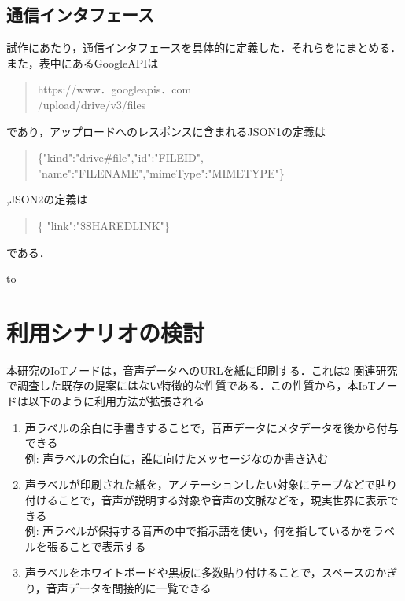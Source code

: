 \documentclass[submit,techrep,noauthor]{ipsj}
\begin{document}
\subsection{通信インタフェース}
試作にあたり，通信インタフェースを具体的に定義した．それらをにまとめる．また，表中にあるGoogleAPIは
\begin{quote}
    https://www．googleapis．com\\/upload/drive/v3/files
\end{quote}であり，アップロードへのレスポンスに含まれるJSON1の定義は\begin{quote}
    \{"kind":"drive\#file","id":"FILEID", "name":"FILENAME","mimeType":"MIMETYPE"\}
\end{quote},JSON2の定義は\begin{quote}
    \{ "link":"\$SHAREDLINK"\}
\end{quote}である．

\begin{table}[tb] 
\caption{試作物の通信インタフェース} 
\label{tab:proto-communication}
\hbox to
\end{table}

\section{利用シナリオの検討}
本研究のIoTノードは，音声データへのURLを紙に印刷する．これは2 関連研究で調査した既存の提案にはない特徴的な性質である．この性質から，本IoTノードは以下のように利用方法が拡張される
\begin{enumerate}
    \item 声ラベルの余白に手書きすることで，音声データにメタデータを後から付与できる\\例: 声ラベルの余白に，誰に向けたメッセージなのか書き込む
    \item 声ラベルが印刷された紙を，アノテーションしたい対象にテープなどで貼り付けることで，音声が説明する対象や音声の文脈などを，現実世界に表示できる \\例: 声ラベルが保持する音声の中で指示語を使い，何を指しているかをラベルを張ることで表示する
    \item 声ラベルをホワイトボードや黒板に多数貼り付けることで，スペースのかぎり，音声データを間接的に一覧できる
\end{enumerate}
\end{document}

